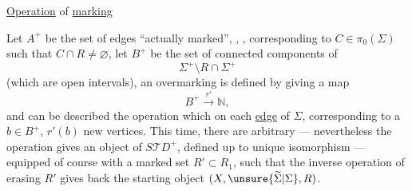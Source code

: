  
\uline{Operation} of  \uline{marking}

Let $A^+$ be the set of edges  ``actually marked'', ,
,
corresponding to $C\in\pi_0(\Sigma)$ such that $C\cap R\ne\varnothing$, let $B^+$ be the set of connected components of
\[
 \Sigma^+\setminus R\cap\Sigma^+
\]
(which are open intervals), an overmarking is defined by giving a map
\[
 B^+\xrightarrow{r'}\mathbb N,
\]
and can be described   the operation which on each
\uline{edge} 
of $\Sigma$, corresponding to a $b\in B^+$, $r'(b)$ new   vertices.
This time,  there are arbitrary  --- nevertheless the operation gives an object of $S\mathcal TD^+$, defined up to unique isomorphism  --- equipped of course with a marked set $R'\subset R_1$, such that the inverse operation of erasing $R'$ gives back the starting object $(X,\unsure{\widetilde\Sigma|\Sigma},R)$.

